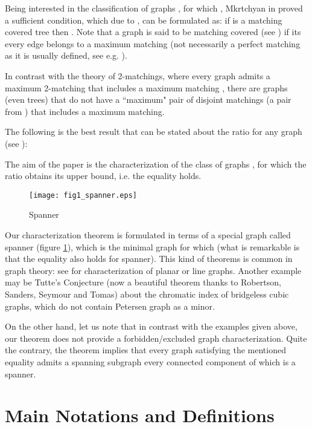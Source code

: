 \documentclass[a4paper, 12pt]{article}
\begin{document}
Being interested in the classification of graphs , for which
, Mkrtchyan in \cite{MPP01} proved a
sufficient condition, which due to \cite{Har, Har-Plum}, can be
formulated as: if  is a matching covered tree then . Note that a graph is said to be matching covered (see
\cite{Perfect}) if its every edge belongs to a maximum matching (not
necessarily a perfect matching as it is usually defined, see e.g.
\cite{Lov-Plum}).

In contrast with the theory of 2-matchings, where every graph 
admits a maximum 2-matching that includes a maximum matching
\cite{Lov-Plum}, there are graphs (even trees) that do not have a
``maximum" pair of disjoint matchings (a pair from ) that
includes a maximum matching.

The following is the best result that can be stated about the ratio
 for any graph  (see \cite{VAV}):


The aim of the paper is the characterization of the class of graphs
, for which the ratio  obtains its
upper bound, i.e. the equality  holds.

\begin{figure}[h]
\begin{center}
\texttt{[image: fig1\_spanner.eps]}\\
\caption{Spanner}\label{fig_spanner}
\end{center}
\end{figure}

Our characterization theorem is formulated in terms of a special
graph called spanner (figure \ref{fig_spanner}), which is the
minimal graph for which  (what is remarkable is
that the equality  also holds
for spanner). This kind of theorems is common in graph theory: see
\cite{Har} for characterization of planar or line graphs. Another
example may be Tutte's Conjecture (now a beautiful theorem thanks to
Robertson, Sanders, Seymour and Tomas) about the chromatic index of
bridgeless cubic graphs, which do not contain Petersen graph as a
minor.

On the other hand, let us note that in contrast with the examples
given above, our theorem does not provide a forbidden/excluded graph
characterization. Quite the contrary, the theorem implies that every
graph satisfying the mentioned equality admits a spanning subgraph
every connected component of which is a spanner.


\section{Main Notations and Definitions}
\end{document}
